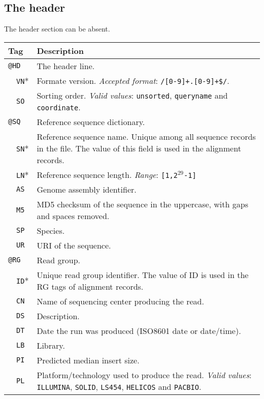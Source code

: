\documentclass[10pt]{article}
\begin{document}
\subsection{The header}
The header section can be absent.
\begin{center}
\begin{tabular}{|l|l|p{13.5cm}|}
  \hline
  \multicolumn{2}{|l|}{\bf Tag} & {\bf Description} \\
  \hline
  \multicolumn{2}{|l}{\tt @HD} & The header line. \\\cline{2-3}
  & {\tt VN}* & Formate version. \emph{Accepted format}: {\tt /\char94[0-9]+\char92.[0-9]+\$/}.\\\cline{2-3}
  & {\tt SO} & Sorting order. \emph{Valid values}: {\tt unsorted}, {\tt queryname} and {\tt coordinate}. \\\hline
  \multicolumn{2}{|l}{\tt @SQ} & Reference sequence dictionary. \\\cline{2-3}
  & {\tt SN}* & Reference sequence name. Unique among all
  sequence records in the file. The value of this field is used in the
  alignment records. \\\cline{2-3}
  & {\tt LN}* & Reference sequence length. \emph{Range}: {\tt [1,2$^{29}$-1]}\\\cline{2-3}
  & {\tt AS} & Genome assembly identifier. \\\cline{2-3}
  & {\tt M5} & MD5 checksum of the sequence in the uppercase, with gaps and spaces removed.\\\cline{2-3}
  & {\tt SP} & Species.\\\cline{2-3}
  & {\tt UR} & URI of the sequence.\\\hline
  \multicolumn{2}{|l}{\tt @RG} & Read group. \\\cline{2-3}
  & {\tt ID}* & Unique read group identifier. The value of ID
  is used in the RG tags of alignment records. \\\cline{2-3}
  & {\tt CN} & Name of sequencing center producing the read.\\\cline{2-3}
  & {\tt DS} & Description.\\\cline{2-3}
  & {\tt DT} & Date the run was produced (ISO8601 date or date/time).\\\cline{2-3}
  & {\tt LB} & Library.\\\cline{2-3}
  & {\tt PI} & Predicted median insert size.\\\cline{2-3}
  & {\tt PL} & Platform/technology used to produce the read. \emph{Valid values}:
  {\tt ILLUMINA}, {\tt SOLID}, {\tt LS454}, {\tt HELICOS} and {\tt PACBIO}.\\\cline{2-3}

\end{tabular}
\end{center}
\end{document}
